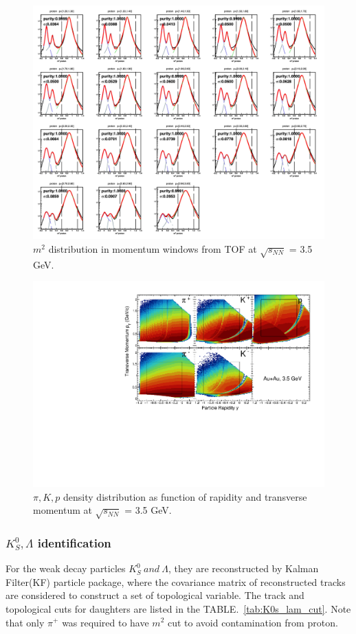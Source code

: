 \begin{figure}[hbt!]
\centering
\includegraphics[width=0.55\linewidth]{figures/chapter02/m2_p_3p5gev.png}
\caption{$m^2$ distribution in momentum windows from TOF at $\sqrt{s_{NN}}$ = 3.5 GeV.}
\label{fig:m2_p_3p5}
\end{figure}

\begin{figure}[hbt!]
\centering
\includegraphics[width=0.55\linewidth]{figures/chapter02/3p5_piKp_acceptance.pdf}
\caption{$\pi, K, p$ density distribution as function of rapidity and transverse momentum at $\sqrt{s_{NN}}$ = 3.5 GeV.}
\label{fig:3p5_piKp_acceptance}
\end{figure}


\subsubsection{$K^{0}_{S}, \Lambda$ identification}

For the weak decay particles $K^{0}_{S}~and~\Lambda$, they are reconstructed by Kalman Filter(KF) particle package\cite{doi:10.1142/S0217751X20430034},
where the covariance matrix of reconstructed tracks are considered to construct a set of topological variable.
The track and topological cuts for daughters are listed in the TABLE.~\ref{tab:K0s_lam_cut}.
Note that only $\pi^{+}$ was required to have $m^2$ cut to avoid contamination from proton.

